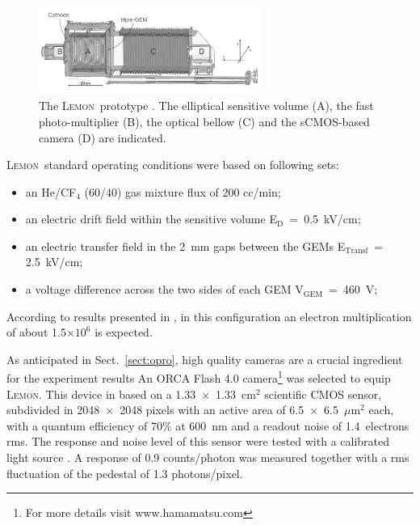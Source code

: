 \documentclass[physics,article,submit,moreauthors,pdftex]{Definitions/mdpi}
\newcommand{\lemon}{{\textsc{Lemon}}\xspace}
\newcommand{\Ed}  {E$_{\mathrm{D}}$\xspace}
\newcommand{\Et}  {E$_{\mathrm{Transf}}$\xspace}
\newcommand{\Vg}  {V$_{\mathrm{GEM}}$\xspace}
\begin{document}
\begin{figure}[t!]
\centering
\includegraphics[width=0.65\textwidth]{Fig2-lemon.png}
\caption{The \lemon\ prototype \cite{bib:Antochi_2021}. The elliptical sensitive volume (A), the fast photo-multiplier (B), the optical bellow (C) and the sCMOS-based camera (D) are indicated.}  
\label{fig:lemon}
\end{figure}

\lemon\ standard operating conditions were based on following sets: 
\begin{itemize}
    \item an He/CF$_4$ (60/40) gas mixture flux of 200 cc/min;
    \item an electric drift field within the sensitive volume \Ed~=~0.5~kV/cm;
    \item an electric transfer field in the 2~mm gaps between the GEMs \Et~= 2.5~kV/cm;
    \item a voltage difference across the two sides of each GEM \Vg~=~460~V;
\end{itemize}

According to results presented in \cite{bib:roby}, in this configuration an electron multiplication of about 1.5$\times 10^6$ is expected.


As anticipated in Sect.~\ref{sect:opro}, high quality cameras are a crucial ingredient for the experiment results An ORCA Flash 4.0 camera\footnote{For more details visit www.hamamatsu.com} was selected to equip \lemon. This device in based on a 1.33~$\times$~1.33~cm$^2$ scientific CMOS sensor, subdivided in 2048~$\times$~2048 pixels with an active area of 6.5~$\times$~6.5~$\mu$m$^2$ each, with a quantum efficiency of 70\% at 600~nm and a readout noise of 1.4~electrons rms. The response and noise level of this sensor were tested with a calibrated light source \cite{bib:jinst_orange1}. A response of 0.9 counts/photon was measured together with a rms fluctuation of the pedestal of 1.3 photons/pixel. 
 
\end{document}
